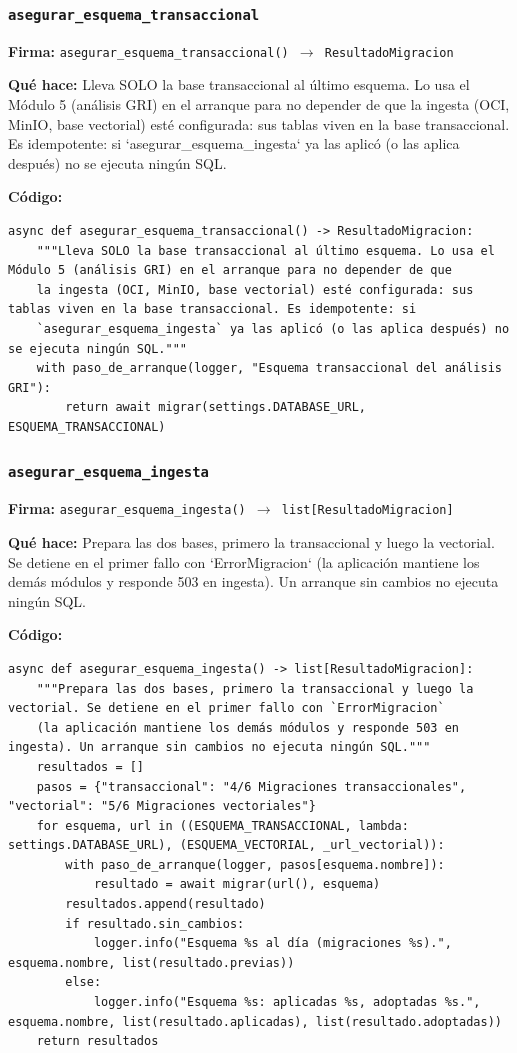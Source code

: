 \documentclass[11pt,a4paper]{article}
\begin{document}
\subsubsection*{\texttt{asegurar\_esquema\_transaccional}}
\textbf{Firma:} \texttt{asegurar\_esquema\_transaccional() $\rightarrow$ ResultadoMigracion}

\textbf{Qué hace:} Lleva SOLO la base transaccional al último esquema. Lo usa el Módulo 5 (análisis GRI) en el arranque para no depender de que
la ingesta (OCI, MinIO, base vectorial) esté configurada: sus tablas viven en la base transaccional. Es idempotente: si
`asegurar\_esquema\_ingesta` ya las aplicó (o las aplica después) no se ejecuta ningún SQL.

\textbf{Código:}
\begin{lstlisting}
async def asegurar_esquema_transaccional() -> ResultadoMigracion:
    """Lleva SOLO la base transaccional al último esquema. Lo usa el Módulo 5 (análisis GRI) en el arranque para no depender de que
    la ingesta (OCI, MinIO, base vectorial) esté configurada: sus tablas viven en la base transaccional. Es idempotente: si
    `asegurar_esquema_ingesta` ya las aplicó (o las aplica después) no se ejecuta ningún SQL."""
    with paso_de_arranque(logger, "Esquema transaccional del análisis GRI"):
        return await migrar(settings.DATABASE_URL, ESQUEMA_TRANSACCIONAL)
\end{lstlisting}

\subsubsection*{\texttt{asegurar\_esquema\_ingesta}}
\textbf{Firma:} \texttt{asegurar\_esquema\_ingesta() $\rightarrow$ list[ResultadoMigracion]}

\textbf{Qué hace:} Prepara las dos bases, primero la transaccional y luego la vectorial. Se detiene en el primer fallo con `ErrorMigracion`
(la aplicación mantiene los demás módulos y responde 503 en ingesta). Un arranque sin cambios no ejecuta ningún SQL.

\textbf{Código:}
\begin{lstlisting}
async def asegurar_esquema_ingesta() -> list[ResultadoMigracion]:
    """Prepara las dos bases, primero la transaccional y luego la vectorial. Se detiene en el primer fallo con `ErrorMigracion`
    (la aplicación mantiene los demás módulos y responde 503 en ingesta). Un arranque sin cambios no ejecuta ningún SQL."""
    resultados = []
    pasos = {"transaccional": "4/6 Migraciones transaccionales", "vectorial": "5/6 Migraciones vectoriales"}
    for esquema, url in ((ESQUEMA_TRANSACCIONAL, lambda: settings.DATABASE_URL), (ESQUEMA_VECTORIAL, _url_vectorial)):
        with paso_de_arranque(logger, pasos[esquema.nombre]):
            resultado = await migrar(url(), esquema)
        resultados.append(resultado)
        if resultado.sin_cambios:
            logger.info("Esquema %s al día (migraciones %s).", esquema.nombre, list(resultado.previas))
        else:
            logger.info("Esquema %s: aplicadas %s, adoptadas %s.", esquema.nombre, list(resultado.aplicadas), list(resultado.adoptadas))
    return resultados
\end{lstlisting}
\end{document}
